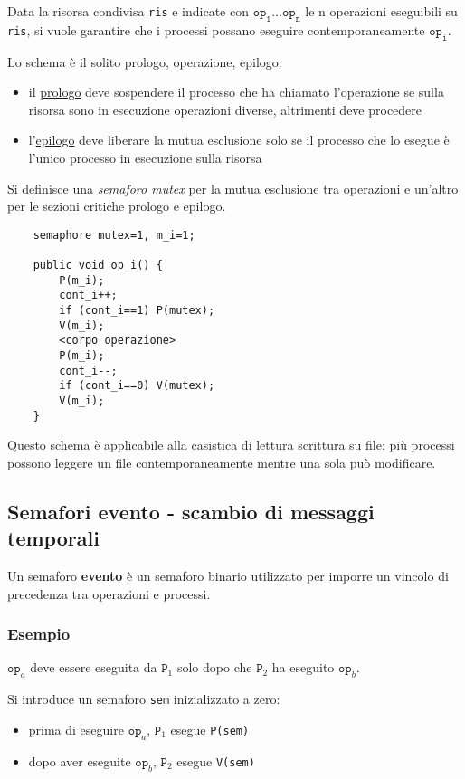 Data la risorsa condivisa \texttt{ris} e indicate con $\texttt{op}_\texttt{1} \dots \texttt{op}_\texttt{n}$ le n operazioni eseguibili su \texttt{ris}, si vuole garantire che i processi possano eseguire contemporaneamente $\texttt{op}_\texttt{i}$.

Lo schema è il solito prologo, operazione, epilogo:
\begin{itemize}
    \item il \underline{prologo} deve sospendere il processo che ha chiamato l'operazione se sulla risorsa sono in esecuzione operazioni diverse, altrimenti deve procedere
    \item l'\underline{epilogo} deve liberare la mutua esclusione solo se il processo che lo esegue è l'unico processo in esecuzione sulla risorsa
\end{itemize}

Si definisce una \textit{semaforo mutex} per la mutua esclusione tra operazioni e un'altro per le sezioni critiche prologo e epilogo.

\begin{lstlisting}
    semaphore mutex=1, m_i=1;

    public void op_i() {
        P(m_i);
        cont_i++;
        if (cont_i==1) P(mutex);
        V(m_i);
        <corpo operazione>
        P(m_i);
        cont_i--;
        if (cont_i==0) V(mutex);
        V(m_i);
    }
\end{lstlisting}

Questo schema è applicabile alla casistica di lettura scrittura su file: più processi possono leggere un file contemporaneamente mentre una sola può modificare.

\subsection{Semafori evento - scambio di messaggi temporali}
Un semaforo \textbf{evento} è un semaforo binario utilizzato per imporre un vincolo di precedenza tra operazioni e processi.

\subsubsection{Esempio}
$\texttt{op}_a$ deve essere eseguita da $\texttt{P}_1$ solo dopo che $\texttt{P}_2$ ha eseguito $\texttt{op}_b$.

Si introduce un semaforo \texttt{sem} inizializzato a zero:
\begin{itemize}
    \item prima di eseguire $\texttt{op}_a$, $\texttt{P}_1$ esegue \texttt{P(sem)}
    \item dopo aver eseguite $\texttt{op}_b$, $\texttt{P}_2$ esegue \texttt{V(sem)}
\end{itemize}

